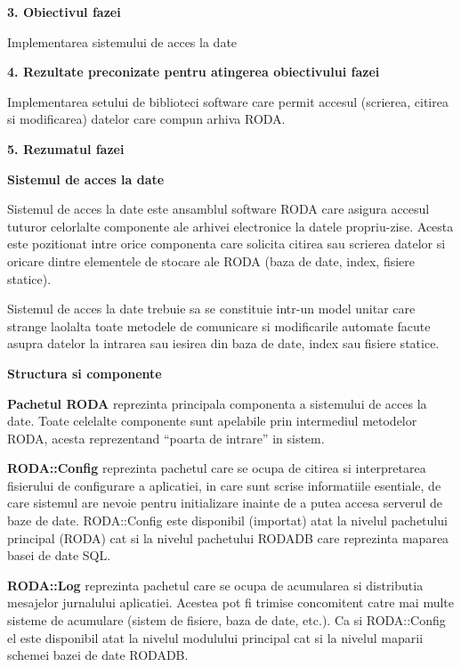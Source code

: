 \documentclass[a4paper]{article}
\begin{document}
{\bigskip
{\bfseries
3. Obiectivul fazei}

{
Implementarea sistemului de acces la date}

\bigskip
{\bfseries
4. Rezultate preconizate pentru atingerea obiectivului fazei}

{
Implementarea setului de biblioteci software care permit accesul (scrierea, citirea si modificarea) datelor care compun
arhiva RODA. }

\bigskip
{\bfseries
5. Rezumatul fazei}

{\bfseries\color[rgb]{0.0,0.0,0.039215688}
Sistemul de acces la date}

{
Sistemul de acces la date este ansamblul software RODA care asigura accesul tuturor celorlalte componente ale arhivei
electronice la datele propriu-zise. Acesta este pozitionat intre orice componenta care solicita citirea sau scrierea
datelor si oricare dintre elementele de stocare ale RODA (baza de date, index, fisiere statice).}

\bigskip

{
Sistemul de acces la date trebuie sa se constituie intr-un model unitar care strange laolalta toate metodele de
comunicare si modificarile automate facute asupra datelor la intrarea sau iesirea din baza de date, index sau fisiere
statice.}

{\bfseries\color[rgb]{0.0,0.0,0.039215688}
Structura si componente}

{
\textbf{Pachetul RODA} reprezinta principala componenta a sistemului de acces la date. Toate celelalte componente sunt
apelabile prin intermediul metodelor RODA, acesta reprezentand ``poarta de intrare'' in sistem.}

\bigskip

{
\textbf{RODA::Config} reprezinta pachetul care se ocupa de citirea si interpretarea fisierului de configurare a
aplicatiei, in care sunt scrise informatiile esentiale, de care sistemul are nevoie pentru initializare inainte de a
putea accesa serverul de baze de date. RODA::Config este disponibil (importat) atat la nivelul pachetului principal
(RODA) cat si la nivelul pachetului RODADB care reprezinta maparea basei de date SQL.}


\bigskip

{
\textbf{RODA::Log} reprezinta pachetul care se ocupa de acumularea si distributia mesajelor jurnalului aplicatiei.
Acestea pot fi trimise concomitent catre mai multe sisteme de acumulare (sistem de fisiere, baza de date, etc.). Ca si
RODA::Config el este disponibil atat la nivelul modulului principal cat si la nivelul maparii schemei bazei de date
RODADB.}

}
\end{document}
